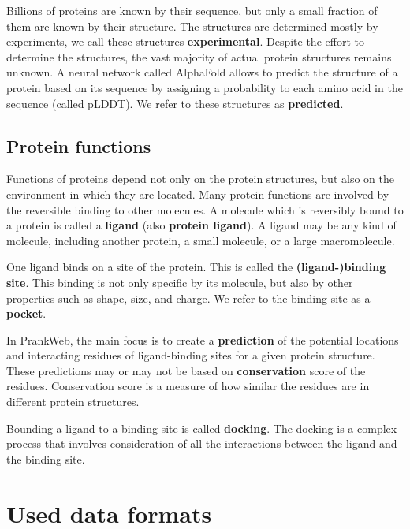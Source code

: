 Billions of proteins are known by their sequence, but only a small fraction of them are known by their structure. The structures are determined mostly by experiments, we call these structures \textbf{experimental}. Despite the effort to determine the structures, the vast majority of actual protein structures remains unknown. A neural network called AlphaFold allows to predict the structure of a protein based on its sequence by assigning a probability to each amino acid in the sequence (called pLDDT). We refer to these structures as \textbf{predicted}. \cite{jumper2021highly}

\subsection{Protein functions}
\label{subsec:protein_functions}

Functions of proteins depend not only on the protein structures, but also on the environment in which they are located. Many protein functions are involved by the reversible binding to other molecules. A molecule which is reversibly bound to a protein is called a \textbf{ligand} (also \textbf{protein ligand}). A ligand may be any kind of molecule, including another protein, a small molecule, or a large macromolecule. 

One ligand binds on a site of the protein. This is called the \textbf{(ligand-)binding site}. This binding is not only specific by its molecule, but also by other properties such as shape, size, and charge. We refer to the binding site as a \textbf{pocket}. \cite{nelson2008lehninger}

In PrankWeb, the main focus is to create a \textbf{prediction} of the potential locations and interacting residues of ligand-binding sites for a given protein structure. These predictions may or may not be based on \textbf{conservation} score of the residues. Conservation score is a measure of how similar the residues are in different protein structures.

Bounding a ligand to a binding site is called \textbf{docking}. The docking is a complex process that involves consideration of all the interactions between the ligand and the binding site. \cite{sulimov2019advances}


\section{Used data formats}
\label{sec:used_data_formats}

